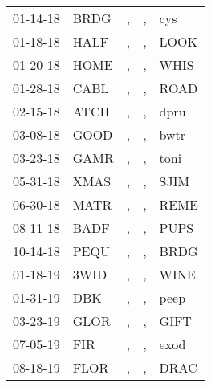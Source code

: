 \begin{supertabular}{lllll}
 01-14-18 &  BRDG &  , &  , &   cys \\
 01-18-18 &  HALF &  , &  , &  LOOK \\
 01-20-18 &  HOME &  , &  , &  WHIS \\
 01-28-18 &  CABL &  , &  , &  ROAD \\
 02-15-18 &  ATCH &  , &  , &  dpru \\
 03-08-18 &  GOOD &  , &  , &  bwtr \\
 03-23-18 &  GAMR &  , &  , &  toni \\
 05-31-18 &  XMAS &  , &  , &  SJIM \\
 06-30-18 &  MATR &  , &  , &  REME \\
 08-11-18 &  BADF &  , &  , &  PUPS \\
 10-14-18 &  PEQU &  , &  , &  BRDG \\
 01-18-19 &  3WID &  , &  , &  WINE \\
 01-31-19 &   DBK &  , &  , &  peep \\
 03-23-19 &  GLOR &  , &  , &  GIFT \\
 07-05-19 &   FIR &  , &  , &  exod \\
 08-18-19 &  FLOR &  , &  , &  DRAC \\
\end{supertabular}

